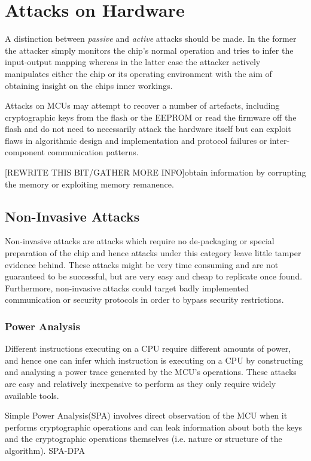 \documentclass[10pt,a4paper,twocolumn]{article}
\begin{document}
\section{Attacks on Hardware}
\label{sec:curr_attacks}
A distinction between \emph{passive} and \emph{active} attacks should be made. In the former the attacker simply monitors the chip's normal operation and tries to infer the input-output mapping whereas in the latter case the attacker actively manipulates either the chip or its operating environment with the aim of obtaining insight on the chips inner workings. 

Attacks on MCUs may attempt to recover a number of artefacts, including cryptographic keys from the flash or the EEPROM or read the firmware off the flash and do not need to necessarily attack the hardware itself but can exploit flaws in algorithmic design and implementation and protocol failures or inter-component communication patterns\citep{anderson:cautionary_note}\citep{kocher:DPA}.

[REWRITE THIS BIT/GATHER MORE INFO]obtain information by corrupting the memory or exploiting memory remanence\citep{sergei:thesis}.
	\subsection{Non-Invasive Attacks}
	Non-invasive attacks are attacks which require no de-packaging or special preparation of the chip and hence attacks under this category leave little tamper evidence behind. These attacks might be very time consuming and are not guaranteed to be successful, but are very easy and cheap to replicate once found. Furthermore, non-invasive attacks could target badly implemented communication or security protocols in order to bypass security restrictions.
	
	\subsubsection{Power Analysis}
	\label{subsubsec:power_analysis}
	Different instructions executing on a CPU require different amounts of power, and hence one can infer which instruction is executing on a CPU by constructing and analysing a power trace generated by the MCU's operations. These attacks are easy and relatively inexpensive to perform as they only require widely available tools.
	
	Simple Power Analysis(SPA) involves direct observation of the MCU when it performs cryptographic operations and can leak information about both the keys and the cryptographic operations themselves (i.e. nature or structure of the algorithm). 
	SPA-DPA
\end{document}
